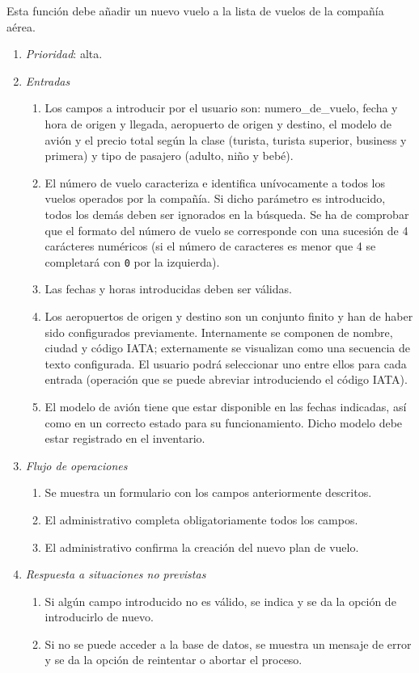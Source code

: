
	Esta función debe añadir un nuevo vuelo a la lista de vuelos de la compañía aérea.

	\begin{enumerate}
		\item \textit{Prioridad}: alta.
		\item \textit{Entradas}
		\begin{enumerate}
			\item Los campos a introducir por el usuario son: \gls{numero_de_vuelo}, fecha y hora de origen y llegada, aeropuerto de origen y destino, el modelo de avión y el  precio total según la clase (turista, turista superior, business y primera) y tipo de pasajero (adulto, niño y bebé).
			\item El número de vuelo caracteriza e identifica unívocamente a todos los vuelos operados por la compañía. Si dicho parámetro es introducido, todos los demás deben ser ignorados en la búsqueda. Se ha de comprobar que el formato del número de vuelo se corresponde con una sucesión de 4 carácteres numéricos (si el número de caracteres es menor que 4 se completará con \verb|0| por la izquierda).
			\item Las fechas y horas introducidas deben ser válidas.
			\item Los aeropuertos de origen y destino son un conjunto finito y han de haber sido configurados previamente. Internamente se componen de nombre, ciudad y código \gls{IATA}; externamente se visualizan como una secuencia de texto configurada. El usuario podrá seleccionar uno entre ellos para cada entrada (operación que se puede abreviar introduciendo el código IATA).
			\item El modelo de avión tiene que estar disponible en las fechas indicadas, así como en un correcto estado para su funcionamiento. Dicho modelo debe estar registrado en el inventario.
		\end{enumerate}
		\item \textit{Flujo de operaciones}
		\begin{enumerate}
			\item Se muestra un formulario con los campos anteriormente descritos.
			\item El administrativo completa obligatoriamente todos los campos.
			\item El administrativo confirma la creación del nuevo plan de vuelo.
		\end{enumerate}
		\item \textit{Respuesta a situaciones no previstas}
		\begin{enumerate}
			\item Si algún campo introducido no es válido, se indica y se da la opción de introducirlo de nuevo.
			\item Si no se puede acceder a la base de datos, se muestra un mensaje de error y se da la opción de reintentar o abortar el proceso.
		\end{enumerate}
	\end{enumerate}
	

